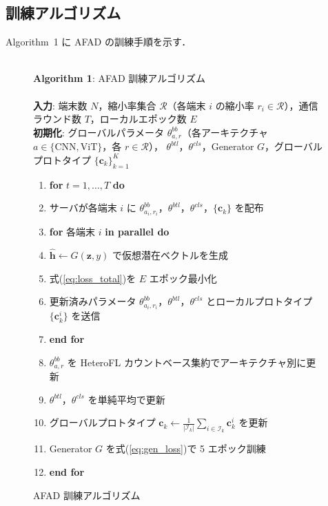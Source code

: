 \subsection{訓練アルゴリズム}

Algorithm~1 に AFAD の訓練手順を示す．

\begin{figure}[htb]
\begin{small}
\noindent\hrulefill\\
\textbf{Algorithm 1}: AFAD 訓練アルゴリズム\\
\hrulefill\\
\textbf{入力}: 端末数 $N$，縮小率集合 $\mathcal{R}$（各端末 $i$ の縮小率 $r_i \in \mathcal{R}$），通信ラウンド数 $T$，ローカルエポック数 $E$\\
\textbf{初期化}: グローバルパラメータ $\theta^{bb}_{a,r}$（各アーキテクチャ $a \in \{\mathrm{CNN}, \mathrm{ViT}\}$，各 $r \in \mathcal{R}$），
$\theta^{btl}$，$\theta^{cls}$，Generator $G$，グローバルプロトタイプ $\{\mathbf{c}_k\}_{k=1}^{K}$\\
\noindent\hrulefill
\begin{enumerate}
  \item \textbf{for} $t = 1, \ldots, T$ \textbf{do}
  \item \quad サーバが各端末 $i$ に $\theta^{bb}_{a_i,r_i}$，$\theta^{btl}$，$\theta^{cls}$，$\{\mathbf{c}_k\}$ を配布
  \item \quad \textbf{for} 各端末 $i$ \textbf{in parallel do}
  \item \quad\quad $\hat{\mathbf{h}} \leftarrow G(\mathbf{z}, y)$ で仮想潜在ベクトルを生成
  \item \quad\quad 式(\ref{eq:loss_total})を $E$ エポック最小化
  \item \quad\quad 更新済みパラメータ $\theta^{bb}_{a_i,r_i}$，$\theta^{btl}$，$\theta^{cls}$ とローカルプロトタイプ $\{\mathbf{c}_k^i\}$ を送信
  \item \quad \textbf{end for}
  \item \quad $\theta^{bb}_{a,r}$ を HeteroFL カウントベース集約でアーキテクチャ別に更新
  \item \quad $\theta^{btl}$，$\theta^{cls}$ を単純平均で更新
  \item \quad グローバルプロトタイプ $\mathbf{c}_k \leftarrow \frac{1}{|\mathcal{I}_k|}\sum_{i\in\mathcal{I}_k}\mathbf{c}_k^i$ を更新
  \item \quad Generator $G$ を式(\ref{eq:gen_loss})で 5 エポック訓練
  \item \textbf{end for}
\end{enumerate}
\hrulefill
\end{small}
\caption{AFAD 訓練アルゴリズム}
\label{alg:afad}
\end{figure}


